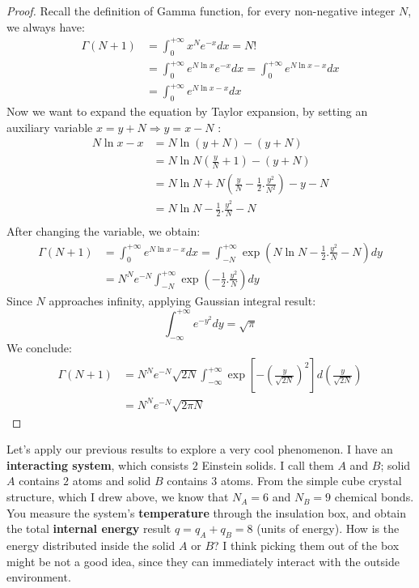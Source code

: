 \documentclass[~/PhyAI/phyai.tex]{subfiles}
\begin{document}
\begin{proof}
	Recall the definition of Gamma function, for every non-negative integer $N$, we always have:
	\begin{equation*}
		\begin{split}
			\Gamma(N+1)&=\int_{0 }^{+\infty}x^{N}e^{-x}dx=N!\\
			&=\int_{0 }^{+\infty} e^{N\ln{x}}e^{-x}dx=\int_{0 }^{+\infty} e^{N\ln{x}-x}dx\\
			&=\int_{0 }^{+\infty}e^{N\ln{x}-x}dx
		\end{split}
	\end{equation*}
	Now we want to expand the equation by Taylor expansion, by setting an auxiliary variable $x=y+N\Rightarrow y=x-N$ :
	\begin{equation*}
		\begin{split}
			N\ln{x}-x&=N\ln{(y+N)}-(y+N)\\
			&=N\ln{N\left(\frac{y }{N}+1\right)}-(y+N)\\
			&= N\ln{N}+N \left(\frac{y }{N}-\frac{1 }{2}.\frac{y^{2} }{N^{2}}\right)-y-N\\
			&=N\ln{N}-\frac{1 }{2}.\frac{y^{2} }{N}-N\\
		\end{split}
	\end{equation*}
	After changing the variable, we obtain:
	\begin{equation*}
		\begin{split}
			\Gamma(N+1)&=\int_{0 }^{+\infty}e^{N\ln{x}-x}dx=\int_{-N }^{+\infty}\exp{\left(N\ln{N}-\frac{1 }{2}.\frac{y^{2} }{N}-N\right)} dy\\
			&=N^{N}e^{-N}\int_{-N }^{+\infty}\exp \left(-\frac{1 }{2}.\frac{y^{2}}{N}\right) dy
		\end{split}
	\end{equation*}
	Since $N$ approaches infinity, applying Gaussian integral result:
	$$ \int_{-\infty }^{+\infty }e^{-y^{2}}dy=\sqrt{\pi}  $$
	We conclude:
	\begin{equation*}
		\begin{split}
			\Gamma(N+1)&=N^{N}e^{-N}\sqrt{2N}\int_{-\infty }^{+\infty}\exp \left[-\left(\frac{y }{\sqrt{2N}}\right)^{2}\right] d \left(\frac{y }{\sqrt{2N}}\right)\\
			&=N^{N}e^{-N}\sqrt{2\pi N}
		\end{split}
	\end{equation*}
\end{proof}
Let's apply our previous results to explore a very cool phenomenon. I have an \textbf{interacting system}, which consists $2$ Einstein solids. I call them $A$ and $B$; solid $A$ contains $2$ atoms and solid $B$ contains $3$ atoms. From the simple cube crystal structure, which I drew above, we know that $N_{A}=6$ and $N_{B}=9$ chemical bonds. You measure the system's \textbf{temperature} through the insulation box, and obtain the total \textbf{internal energy} result $q=q_{A}+q_{B}=8$ (units of energy). How is the energy distributed inside the solid $A$ or $B$? I think picking them out of the box might be not a good idea, since they can immediately interact with the outside environment.
\end{document}
